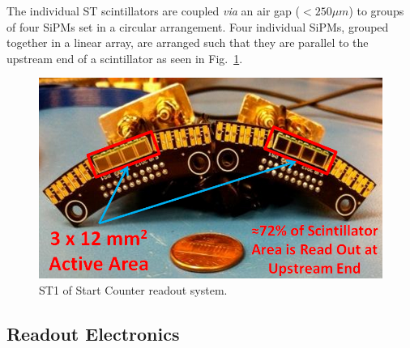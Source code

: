 The individual ST scintillators are coupled \emph{via} an air gap ($< 250 \mu m$) to groups of four SiPMs set in a circular arrangement.  Four individual SiPMs, grouped together in a linear array, are arranged such that they are parallel to the upstream end of a scintillator as seen in Fig.~\ref{fig:Labeled ST1}.
\begin{figure}[!htb]
	\centering
	\includegraphics[width=1.0\columnwidth]{design/figs/Labeled_ST1_Penny}
	\caption[ST1 of Start Counter readout system]{ST1 of Start Counter readout system.}
	\label{fig:Labeled ST1}
\end{figure}  

\subsection{Readout Electronics}

